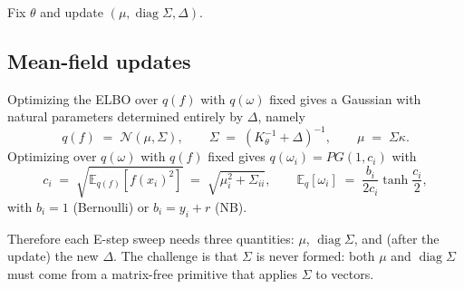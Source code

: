 \documentclass{article}
\newcommand{\E}{\mathbb{E}}
\DeclareMathOperator{\diag}{diag}
\begin{document}
Fix $\theta$ and update $(\mu,\diag\Sigma,\Delta)$.

\subsection{Mean-field updates}
Optimizing the ELBO over $q(f)$ with $q(\omega)$ fixed gives a Gaussian with natural parameters determined entirely by $\Delta$, namely
\[
  q(f) \;=\; \mathcal{N}(\mu,\Sigma),
  \qquad
  \Sigma \;=\; (K_\theta^{-1}+\Delta)^{-1},
  \qquad
  \mu \;=\; \Sigma\kappa.
\]
Optimizing over $q(\omega)$ with $q(f)$ fixed gives $q(\omega_i)=PG(1,c_i)$ with
\[
  c_i \;=\; \sqrt{\E_{q(f)}[f(x_i)^{2}]}
       \;=\; \sqrt{\mu_i^{2}+\Sigma_{ii}},
  \qquad
  \E_q[\omega_i] \;=\; \frac{b_i}{2c_i}\tanh\!\frac{c_i}{2},
\]
with $b_i=1$ (Bernoulli) or $b_i=y_i+r$ (NB).

Therefore each E-step sweep needs three quantities: $\mu$, $\diag\Sigma$, and (after the update) the new $\Delta$. The challenge is that $\Sigma$ is never formed: both $\mu$ and $\diag\Sigma$ must come from a matrix-free primitive that applies $\Sigma$ to vectors.
\end{document}
